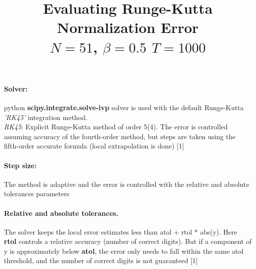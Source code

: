 \documentclass{article}
\begin{document}
\title{Evaluating Runge-Kutta Normalization Error \\ $N=51$, $\beta = 0.5 $ $T=1000$ }
\date{}
\maketitle

\paragraph{Solver:} 
python \textbf{scipy.integrate.solve-ivp} solver is used with the default Runge-Kutta \textit{'RK45'} integration method. \\
\textit{RK45}: Explicit Runge-Kutta method of order 5(4). The error is controlled assuming accuracy of the fourth-order method, but steps are taken using the fifth-order accurate formula (local extrapolation is done) [1] \\

\paragraph{Step size:}
The method is adaptive and the error is controlled with the relative and absolute tolerances parameters \\

\paragraph{Relative and absolute tolerances.}
The solver keeps the local error estimates less than atol + rtol * abs(y). Here \textbf{rtol} controls a relative accuracy (number of correct digits). But if a component of y is approximately below \textbf{atol}, the error only needs to fall within the same atol threshold, and the number of correct digits is not guaranteed [1]\\ \\ 
\end{document}
